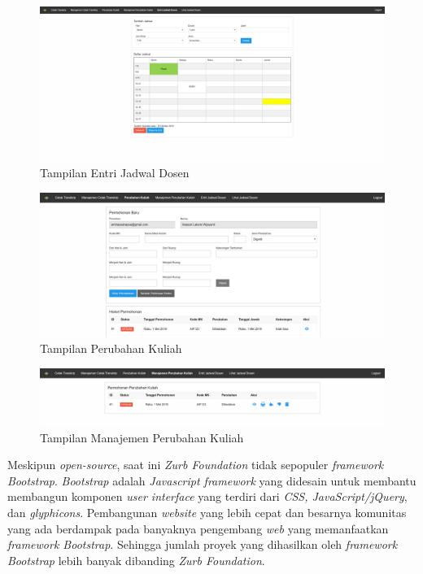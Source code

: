 \documentclass[a4paper,twoside]{article}
\begin{document}
	\begin{figure}[h]
		\includegraphics [scale=0.5] {Tampilan-Entri-Jadwal-Dosen.PNG}
		\caption{Tampilan Entri Jadwal Dosen}
	\end{figure}
	
	\begin{figure}[ht!]
		\includegraphics [scale=0.5] {Tampilan-Perubahan-Kuliah.PNG}
		\caption{Tampilan Perubahan Kuliah}
	\end{figure}
	
	\begin{figure}[ht!]
		\includegraphics [scale=0.5] {Tampilan-Manajemen-Perubahan-Kuliah.PNG}
		\caption{Tampilan Manajemen Perubahan Kuliah}
	\end{figure}
	
	
	
	
	Meskipun \textit{open-source}, saat ini \textit{Zurb Foundation} tidak sepopuler \textit{framework} \textit{Bootstrap}. 
	\textit{Bootstrap} adalah \textit{ Javascript framework} yang didesain untuk membantu membangun komponen \textit{user interface} yang terdiri dari \textit{CSS, JavaScript/jQuery}, dan \textit{glyphicons}. Pembangunan \textit{website} yang lebih cepat dan besarnya komunitas yang ada berdampak pada banyaknya pengembang \textit{web} yang memanfaatkan \textit{framework Bootstrap}. Sehingga jumlah proyek yang dihasilkan oleh\textit{ framework Bootstrap} lebih banyak dibanding \textit{Zurb Foundation}. 
	
\end{document}
